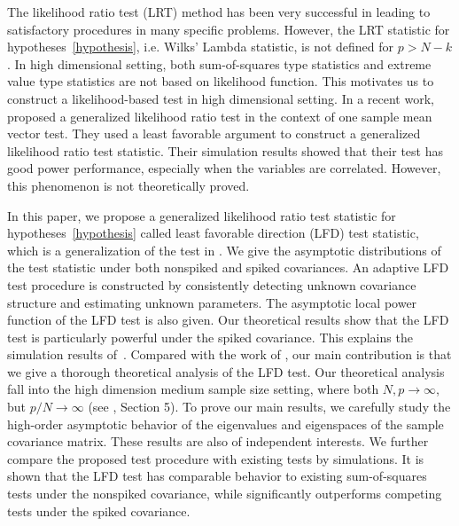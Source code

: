 \documentclass[12pt]{article} %
\theoremstyle{definition}
\begin{document}
   The likelihood ratio test (LRT) method has been very successful in leading to satisfactory procedures in many specific problems.
    However, the LRT statistic for hypotheses~\eqref{hypothesis}, i.e. Wilks' Lambda statistic, is not defined for $p>N-k$.
   In high dimensional setting, both sum-of-squares type statistics and extreme value type statistics are not based on likelihood function.
    This motivates us to construct a likelihood-based test in high dimensional setting.
    In a recent work,~\cite{Zhao2016A} proposed a generalized likelihood ratio test in the context of one sample mean vector test.
    They used a least favorable argument to construct a generalized likelihood ratio test statistic.
    Their simulation results showed that their test has good power performance, especially when the variables are correlated.
    However, this phenomenon is not theoretically proved.


    In this paper, we propose a generalized likelihood ratio test statistic for hypotheses~\eqref{hypothesis} called least favorable direction (LFD) test statistic, which is a generalization of the test in \cite{Zhao2016A}.
    We give the asymptotic distributions of the test statistic under both nonspiked and spiked covariances.
    An adaptive LFD test procedure is constructed by consistently detecting unknown covariance structure and estimating unknown parameters.
    The asymptotic local power function of the LFD test is also given.
    Our theoretical results show that the LFD test is particularly powerful under the spiked covariance.
    This explains the simulation results of~\cite{Zhao2016A}.
    Compared with the work of \cite{Zhao2016A}, our main contribution is that we give a thorough theoretical analysis of the LFD test.
    Our theoretical analysis fall into the high dimension medium sample size setting, where both $N,p\to \infty$, but $p/N\to \infty$ (see \cite{aoshima2018A}, Section 5).
    To prove our main results, we carefully study the high-order asymptotic behavior of the eigenvalues and eigenspaces of the sample covariance matrix.
    These results are also of independent interests.
    We further compare the proposed test procedure with existing tests by simulations.
    It is shown that the LFD test has comparable behavior to existing sum-of-squares tests under the nonspiked covariance, while significantly outperforms competing tests under the spiked covariance.
\end{document}
